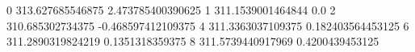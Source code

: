 0 313.627685546875 2.473785400390625
1 311.1539001464844 0.0
2 310.685302734375 -0.468597412109375
4 311.3363037109375 0.182403564453125
6 311.2890319824219 0.1351318359375
8 311.5739440917969 0.4200439453125

